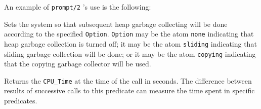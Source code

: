 \begin{description}
    An example of {\tt prompt/2} 's use is the following:


    Sets the system so that subsequent heap garbage collecting will be
    done according to the specified {\tt Option}.  {\tt Option} may be
    the atom \verb|none| indicating that heap garbage collection is
    turned off; it may be the atom \verb|sliding| indicating that
    sliding garbage collection will be done; or it may be the atom
    \verb|copying| indicating that the copying garbage collector will
    be used.
 
    Returns the {\tt CPU\_Time} at the time of the call in seconds.
    The difference between results of successive calls to this
    predicate can measure the time spent in specific predicates.


\end{description}
